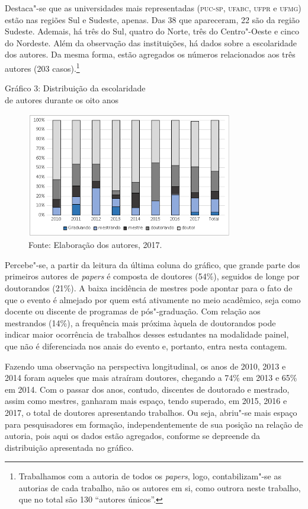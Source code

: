 Destaca"-se que as universidades mais representadas (\textsc{puc}-\textsc{sp}, \textsc{ufabc}, \textsc{ufpr}
e \textsc{ufmg}) estão nas regiões Sul e Sudeste, apenas. Das 38 que apareceram,
22 são da região Sudeste. Ademais, há três do Sul, quatro do Norte, três
do Centro"-Oeste e cinco do Nordeste. Além da observação das
instituições, há dados sobre a escolaridade dos autores. Da mesma
forma, estão agregados os números relacionados aos três autores
(203 casos).\footnote{Trabalhamos com a autoria de todos os
  \emph{papers}, logo, contabilizam"-se as autorias de cada trabalho, não
  os autores em si, como outrora neste trabalho, que no total são 130
  ``autores únicos''.}

\begin{center}
Gráfico 3: Distribuição da escolaridade\\ de autores durante os oito anos
\end{center}

\begin{figure}[!ht]
\centering
 \includegraphics[width=90mm]{./imgs/graf3_3.png}
\caption{Fonte: Elaboração dos autores, 2017.}
\end{figure}

Percebe"-se, a partir da leitura da última coluna do gráfico, que grande
parte dos primeiros autores de \emph{papers} é composta de
doutores (54\%), seguidos de longe por doutorandos (21\%). A
baixa incidência de mestres pode apontar para o fato de que o evento
é almejado por quem está ativamente no meio acadêmico, seja como docente
ou discente de programas de pós"-graduação. Com relação aos
mestrandos (14\%), a frequência mais próxima àquela de doutorandos
pode indicar maior ocorrência de trabalhos desses estudantes na
modalidade painel, que não é diferenciada nos anais do evento e,
portanto, entra nesta contagem.

Fazendo uma observação na perspectiva longitudinal, os anos de 2010,
2013 e 2014 foram aqueles que mais atraíram doutores, chegando a 74\%
em 2013 e 65\% em 2014. Com o passar dos anos, contudo, discentes de
doutorado e mestrado, assim como mestres, ganharam mais espaço, tendo
superado, em 2015, 2016 e 2017, o total de doutores apresentando
trabalhos. Ou seja, abriu"-se mais espaço para pesquisadores em
formação, independentemente de sua posição na relação de autoria, pois
aqui os dados estão agregados, conforme se depreende da distribuição
apresentada no gráfico.

